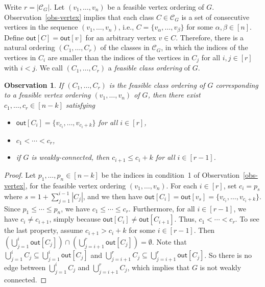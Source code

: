 \documentclass[11pt]{article}
\newtheorem{observation}{Observation}
\begin{document}
Write $r = |\mathcal{C}_G|$.
Let $(v_1,\dots,v_n)$ be a feasible vertex ordering of $G$.
Observation~\ref{obs-vertex} implies that each class $C \in \mathcal{C}_G$ is a set of consecutive vertices in the sequence $(v_1,\dots,v_n)$, i.e., $C = \{v_\alpha,\dots,v_\beta\}$ for some $\alpha,\beta \in [n]$.
Define $\mathsf{out}[C] = \mathsf{out}[v]$ for an arbitrary vertex $v \in C$.
Therefore, there is a natural ordering $(C_1,\dots,C_r)$ of the classes in $\mathcal{C}_G$, in which the indices of the vertices in $C_i$ are smaller than the indices of the vertices in $C_j$ for all $i,j \in [r]$ with $i < j$.
We call $(C_1,\dots,C_r)$ a \textit{feasible class ordering} of $G$.

\begin{observation} \label{obs-class}
    If $(C_1,\dots,C_r)$ is the feasible class ordering of $G$ corresponding to a feasible vertex ordering $(v_1,\dots,v_n)$ of $G$, then there exist $c_1,\dots,c_r \in [n-k]$ satisfying
    \begin{itemize}
        \item $\mathsf{out}[C_i] = \{v_{c_i},\dots,v_{c_i+k}\}$ for all $i \in [r]$,
        \item $c_1 < \cdots < c_r$,
        \item if $G$ is weakly-connected, then $c_{i+1} \leq c_i+k$ for all $i \in [r-1]$.
    \end{itemize}
\end{observation}
\begin{proof}
Let $p_1,\dots,p_n \in [n-k]$ be the indices in condition~1 of Observation~\ref{obs-vertex}, for the feasible vertex ordering $(v_1,\dots,v_n)$.
For each $i \in [r]$, set $c_i = p_s$ where $s = 1+ \sum_{j=1}^{i-1} |C_j|$, and we then have $\mathsf{out}[C_i] = \mathsf{out}[v_s] = \{v_{c_i},\dots,v_{c_i+k}\}$.
Since $p_1 \leq \cdots \leq p_n$, we have $c_1 \leq \cdots \leq c_r$.
Furthermore, for all $i \in [r-1]$, we have $c_i \neq c_{i+1}$, simply because $\mathsf{out}[C_i] \neq \mathsf{out}[C_{i+1}]$.
Thus, $c_1 < \cdots < c_r$.
To see the last property, assume $c_{i+1} > c_i+k$ for some $i \in [r-1]$.
Then $(\bigcup_{j=1}^i \mathsf{out}[C_j]) \cap (\bigcup_{j=i+1}^r \mathsf{out}[C_j]) = \emptyset$.
Note that $\bigcup_{j=1}^i C_j \subseteq \bigcup_{j=1}^i \mathsf{out}[C_j]$ and $\bigcup_{j=i+1}^r C_j \subseteq \bigcup_{j=i+1}^r \mathsf{out}[C_j]$.
So there is no edge between $\bigcup_{j=1}^i C_j$ and $\bigcup_{j=i+1}^r C_j$, which implies that $G$ is not weakly connected.
\end{proof}
\end{document}
